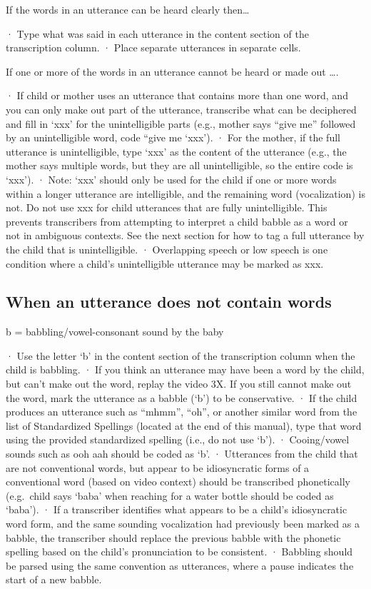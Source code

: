 \documentclass[
]{book}
\begin{document}
If the words in an utterance can be heard clearly then\ldots{}

· Type what was said in each utterance in the content section of the transcription column.
· Place separate utterances in separate cells.

If one or more of the words in an utterance cannot be heard or made out \ldots.

· If child or mother uses an utterance that contains more than one word, and you can only make out part of the utterance, transcribe what can be deciphered and fill in `xxx' for the unintelligible parts (e.g., mother says ``give me'' followed by an unintelligible word, code ``give me `xxx').
· For the mother, if the full utterance is unintelligible, type `xxx' as the content of the utterance (e.g., the mother says multiple words, but they are all unintelligible, so the entire code is `xxx').
· Note: `xxx' should only be used for the child if one or more words within a longer utterance are intelligible, and the remaining word (vocalization) is not. Do not use xxx for child utterances that are fully unintelligible. This prevents transcribers from attempting to interpret a child babble as a word or not in ambiguous contexts. See the next section for how to tag a full utterance by the child that is unintelligible.
· Overlapping speech or low speech is one condition where a child's unintelligible utterance may be marked as xxx.

\hypertarget{when-an-utterance-does-not-contain-words}{%
\subsection{When an utterance does not contain words}\label{when-an-utterance-does-not-contain-words}}

b = babbling/vowel-consonant sound by the baby

· Use the letter `b' in the content section of the transcription column when the child is babbling.
· If you think an utterance may have been a word by the child, but can't make out the word, replay the video 3X. If you still cannot make out the word, mark the utterance as a babble (`b') to be conservative.
· If the child produces an utterance such as ``mhmm'', ``oh'', or another similar word from the list of Standardized Spellings (located at the end of this manual), type that word using the provided standardized spelling (i.e., do not use `b').
· Cooing/vowel sounds such as ooh aah should be coded as `b'.
· Utterances from the child that are not conventional words, but appear to be idiosyncratic forms of a conventional word (based on video context) should be transcribed phonetically (e.g.~child says `baba' when reaching for a water bottle should be coded as `baba').
· If a transcriber identifies what appears to be a child's idiosyncratic word form, and the same sounding vocalization had previously been marked as a babble, the transcriber should replace the previous babble with the phonetic spelling based on the child's pronunciation to be consistent.
· Babbling should be parsed using the same convention as utterances, where a pause indicates the start of a new babble.
\end{document}
